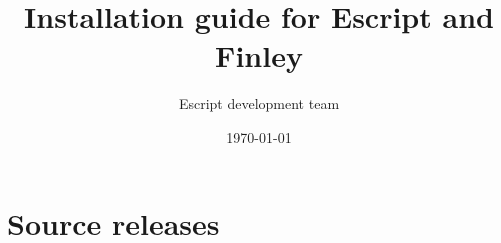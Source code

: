 \documentclass{manual}
\title{Installation guide for Escript and Finley}
\author{Escript development team}
\date{\today}
\begin{document}
\maketitle
\tableofcontents




\chapter{Source releases}
\label{chap:src}


 
\end{document}
